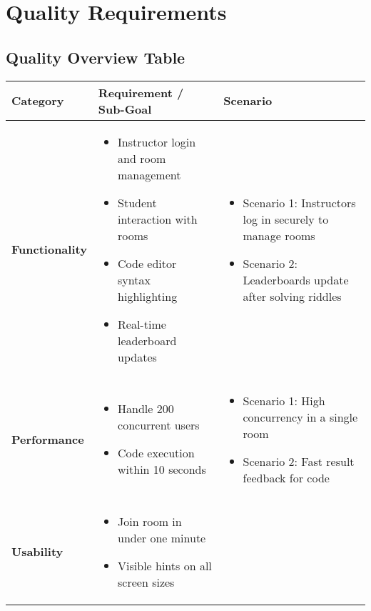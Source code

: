 \section{Quality Requirements}
\label{section-quality-requirements}

\subsection*{Quality Overview Table}

\begin{longtable}{|p{4.2cm}|p{6.8cm}|p{5.8cm}|}
    \hline
    \textbf{Category} & \textbf{Requirement / Sub-Goal} & \textbf{Scenario} \\
    \hline
    \textbf{Functionality} &
    \begin{itemize}
        \item Instructor login and room management
        \item Student interaction with rooms
        \item Code editor syntax highlighting
        \item Real-time leaderboard updates
    \end{itemize} &
    \begin{itemize}
        \item Scenario 1: Instructors log in securely to manage rooms
        \item Scenario 2: Leaderboards update after solving riddles
    \end{itemize} \\
    \hline
    \textbf{Performance} &
    \begin{itemize}
        \item Handle 200 concurrent users
        \item Code execution within 10 seconds
    \end{itemize} &
    \begin{itemize}
        \item Scenario 1: High concurrency in a single room
        \item Scenario 2: Fast result feedback for code
    \end{itemize} \\
    \hline
    \textbf{Usability} &
    \begin{itemize}
        \item Join room in under one minute
        \item Visible hints on all screen sizes
    \end{itemize} &

\end{longtable}
